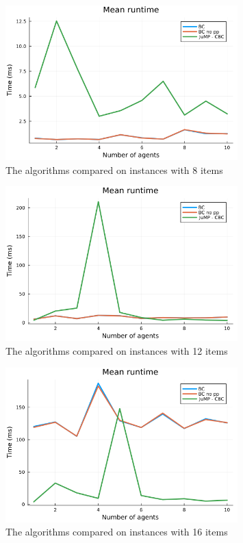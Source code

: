 \documentclass[b5paper]{article}
\begin{document}
\begin{figure}[H]
    \centering
    \includegraphics[width=0.8\textwidth]{mean_1-10agents_8items.png}
    \caption{The algorithms compared on instances with 8 items}
\end{figure}

\begin{figure}[H]
    \centering
    \includegraphics[width=0.8\textwidth]{mean_1-10agents_12items.png}
    \caption{The algorithms compared on instances with 12 items}
\end{figure}

\begin{figure}[H]
    \centering
    \includegraphics[width=0.8\textwidth]{mean_1-10agents_16items.png}
    \caption{The algorithms compared on instances with 16 items}
\end{figure}
\end{document}
